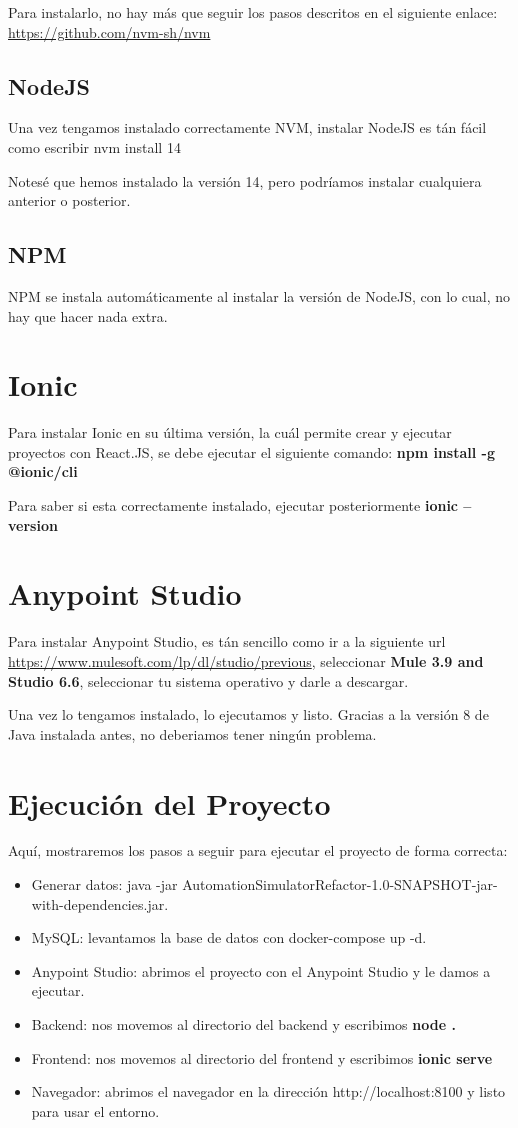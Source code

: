 \documentclass[a4paper,12pt]{article}
\begin{document}
Para instalarlo, no hay más que seguir los pasos descritos en el
siguiente enlace: \url{https://github.com/nvm-sh/nvm}

\subsection{NodeJS}
Una vez tengamos instalado correctamente NVM, instalar NodeJS es tán fácil como escribir
nvm install 14

Notesé que hemos instalado la versión 14, pero podríamos instalar cualquiera anterior o posterior.

\subsection{NPM}
NPM se instala automáticamente al instalar la versión de NodeJS, con lo cual, no hay que hacer nada extra.

\section{Ionic}
Para instalar Ionic en su última versión, la cuál permite crear y ejecutar proyectos con React.JS, 
se debe ejecutar el siguiente comando: \textbf{npm install -g @ionic/cli}

Para saber si esta correctamente instalado, ejecutar posteriormente \textbf{ionic --version}

\section{Anypoint Studio}
Para instalar Anypoint Studio, es tán sencillo como ir a la siguiente url
\url{https://www.mulesoft.com/lp/dl/studio/previous}, seleccionar 
\textbf{Mule 3.9 and Studio 6.6}, seleccionar tu sistema operativo y darle a descargar.

Una vez lo tengamos instalado, lo ejecutamos y listo. Gracias a la versión 8 de Java instalada antes,
no deberiamos tener ningún problema.

\section{Ejecución del Proyecto}
Aquí, mostraremos los pasos a seguir para ejecutar el proyecto de forma correcta:

\begin{itemize}
  \item Generar datos: java -jar AutomationSimulatorRefactor-1.0-SNAPSHOT-jar-with-dependencies.jar.
  \item MySQL: levantamos la base de datos con docker-compose up -d.
  \item Anypoint Studio: abrimos el proyecto con el Anypoint Studio y le damos a ejecutar.
  \item Backend: nos movemos al directorio del backend y escribimos \textbf{node .}
  \item Frontend: nos movemos al directorio del frontend y escribimos \textbf{ionic serve}
  \item Navegador: abrimos el navegador en la dirección http://localhost:8100 y listo para usar el entorno.
\end{itemize}
\end{document}
